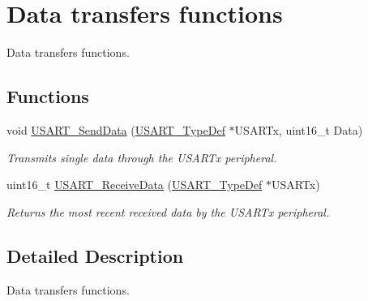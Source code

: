 \hypertarget{group___u_s_a_r_t___group2}{}\section{Data transfers functions}
\label{group___u_s_a_r_t___group2}


Data transfers functions.  


\subsection*{Functions}
\begin{DoxyCompactItemize}
\item 
void \hyperlink{group___u_s_a_r_t___group2_ga0b43d42da9540f446d494bf69823c6fb}{U\+S\+A\+R\+T\+\_\+\+Send\+Data} (\hyperlink{struct_u_s_a_r_t___type_def}{U\+S\+A\+R\+T\+\_\+\+Type\+Def} $\ast$U\+S\+A\+R\+Tx, uint16\+\_\+t Data)
\begin{DoxyCompactList}\small\item\em Transmits single data through the U\+S\+A\+R\+Tx peripheral. \end{DoxyCompactList}\item 
uint16\+\_\+t \hyperlink{group___u_s_a_r_t___group2_gac67a91845b0b1d54d31bdfb1c5e9867c}{U\+S\+A\+R\+T\+\_\+\+Receive\+Data} (\hyperlink{struct_u_s_a_r_t___type_def}{U\+S\+A\+R\+T\+\_\+\+Type\+Def} $\ast$U\+S\+A\+R\+Tx)
\begin{DoxyCompactList}\small\item\em Returns the most recent received data by the U\+S\+A\+R\+Tx peripheral. \end{DoxyCompactList}\end{DoxyCompactItemize}


\subsection{Detailed Description}
Data transfers functions. 

